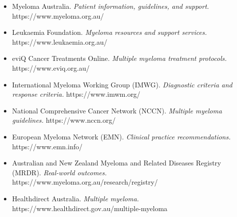 \begin{itemize}
    \item Myeloma Australia. \textit{Patient information, guidelines, and support.} https://www.myeloma.org.au/
    \item Leukaemia Foundation. \textit{Myeloma resources and support services.} https://www.leukaemia.org.au/
    \item eviQ Cancer Treatments Online. \textit{Multiple myeloma treatment protocols.} https://www.eviq.org.au/
    \item International Myeloma Working Group (IMWG). \textit{Diagnostic criteria and response criteria.} https://www.imwm.org/
    \item National Comprehensive Cancer Network (NCCN). \textit{Multiple myeloma guidelines.} https://www.nccn.org/
    \item European Myeloma Network (EMN). \textit{Clinical practice recommendations.} https://www.emn.info/
    \item Australian and New Zealand Myeloma and Related Diseases Registry (MRDR). \textit{Real-world outcomes.} https://www.myeloma.org.au/research/registry/
    \item Healthdirect Australia. \textit{Multiple myeloma.} https://www.healthdirect.gov.au/multiple-myeloma
\end{itemize}
